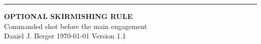 \documentclass[10pt,letterpaper]{article}
\begin{document}
\begin{center}
  {\color{cvred}\rule{\textwidth}{1.5pt}}\par\vspace{7pt}
  {\sffamily\bfseries\fontsize{27}{30}\selectfont\color{cvblue}
    OPTIONAL SKIRMISHING RULE}\\[2pt]
  {\sffamily\large\color{cvred}Commanded shot before the main engagement}\\[3pt]
  {\sffamily\small Daniel J. Berger \textbullet{} \today
    \nobreakspace\textbullet{} Version 1.1}
\end{center}


\clearpage
\thispagestyle{fancy}

\clearpage
\thispagestyle{fancy}

\clearpage
\thispagestyle{fancy}

\end{document}

